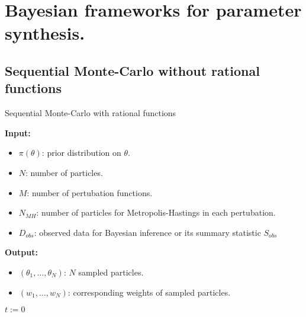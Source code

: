 \chapter{Bayesian frameworks for parameter synthesis.}
\section{Sequential Monte-Carlo without rational functions}
\begin{algorithm}[H]
    \caption{Sequential Monte-Carlo with rational functions}
    \label{smcrf-alg}
    \hspace*{\algorithmicindent} \textbf{Input:}
    \begin{itemize}
        \item $\pi(\theta)$: prior distribution on $\theta$.
        \item $N$: number of particles.
        \item $M$: number of pertubation functions.
        \item $N_{MH}$: number of particles for Metropolis-Hastings in each pertubation.
        \item $D_{obs}$: observed data for Bayesian inference or its summary statistic $S_{obs}$
    \end{itemize}
    \hspace*{\algorithmicindent} \textbf{Output:}
    \begin{itemize}
        \item $(\theta_1,\ldots,\theta_N)$: $N$ sampled particles.
        \item $(w_1,\ldots,w_N)$: corresponding weights of sampled particles.
    \end{itemize}
    \begin{algorithmic}[1]
        \State $t:=0$
        \EndWhile
        \EndProcedure
    \end{algorithmic}
\end{algorithm}



